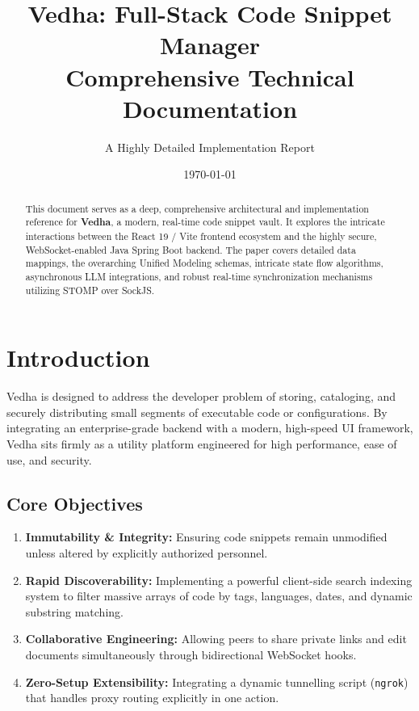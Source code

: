 \documentclass[12pt,a4paper]{article}
\title{\textbf{Vedha: Full-Stack Code Snippet Manager \\ Comprehensive Technical Documentation}}
\author{A Highly Detailed Implementation Report}
\date{\today}
\begin{document}
\maketitle

\begin{abstract}
This document serves as a deep, comprehensive architectural and implementation reference for \textbf{Vedha}, a modern, real-time code snippet vault. It explores the intricate interactions between the React 19 / Vite frontend ecosystem and the highly secure, WebSocket-enabled Java Spring Boot backend. The paper covers detailed data mappings, the overarching Unified Modeling schemas, intricate state flow algorithms, asynchronous LLM integrations, and robust real-time synchronization mechanisms utilizing STOMP over SockJS.
\end{abstract}

\tableofcontents
\newpage

\section{Introduction}
Vedha is designed to address the developer problem of storing, cataloging, and securely distributing small segments of executable code or configurations. By integrating an enterprise-grade backend with a modern, high-speed UI framework, Vedha sits firmly as a utility platform engineered for high performance, ease of use, and security.

\subsection{Core Objectives}
\begin{enumerate}
    \item \textbf{Immutability \& Integrity:} Ensuring code snippets remain unmodified unless altered by explicitly authorized personnel.
    \item \textbf{Rapid Discoverability:} Implementing a powerful client-side search indexing system to filter massive arrays of code by tags, languages, dates, and dynamic substring matching.
    \item \textbf{Collaborative Engineering:} Allowing peers to share private links and edit documents simultaneously through bidirectional WebSocket hooks.
    \item \textbf{Zero-Setup Extensibility:} Integrating a dynamic tunnelling script (\texttt{ngrok}) that handles proxy routing explicitly in one action.
\end{enumerate}
\end{document}
